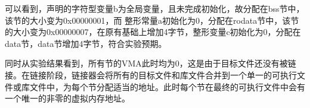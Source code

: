 \documentclass[UTF8,a4paper,10pt]{ctexart}
\begin{document}
可以看到，声明的字符型变量b为全局变量，且未完成初始化，故分配在bss节中，该节的大小变为0x00000001，而
整形常量a初始化为0，分配在rodata节中，该节的大小变为0x00000007，在原有基础上增加4字节，整形变量c初始化为0，分配在data节，data节增加4字节，符合实验预期。\par
同时从实验结果看到，所有节的VMA此时均为0，这是由于目标文件还没有被链接。在链接阶段，链接器会将所有的目标文件和库文件合并到一个单一的可执行文件或库文件中，为每个节分配适当的地址。此时每个节在最终的可执行文件中会有一个唯一的非零的虚拟内存地址。\\
\\
\\
\end{document}
